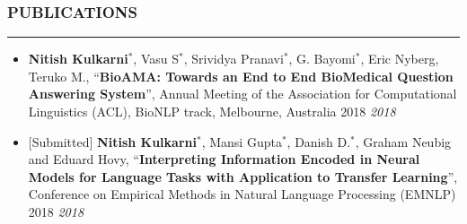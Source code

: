 \documentclass[10pt,a4paper,English]{article}
\newcommand\roottitle[1]{\vspace{-4mm}\subsubsection*{\uppercase{#1}}\vspace{-0.3em}\nopagebreak[4]\hrule\vspace{4mm}}
\newcommand\itemyear[1]{\hfill \emph{\color{itemyear} #1}}
\begin{document}
\roottitle{Publications}
\begin{itemize}[align=left, leftmargin=1em, itemindent=0mm, labelsep=0pt, labelwidth=1em]
    \vspace{-1.5mm}
    \item \textbf{\textbf{Nitish Kulkarni}$^*$}, Vasu S$^*$, Srividya Pranavi$^*$, G. Bayomi$^*$, Eric Nyberg, Teruko M., ``\textbf{BioAMA: Towards an End to End BioMedical Question Answering System}'', Annual Meeting of the Association for Computational Linguistics  (ACL), BioNLP track, Melbourne, Australia 2018 \itemyear{2018}
    \item $\lbrack$Submitted$\rbrack$ \textbf{\textbf{Nitish Kulkarni}$^*$}, Mansi Gupta$^*$, Danish D.$^*$, Graham Neubig and Eduard Hovy, ``\textbf{Interpreting Information Encoded in Neural Models for Language Tasks with Application to Transfer Learning}'', Conference on Empirical Methods in Natural Language Processing (EMNLP) 2018 \itemyear{2018}
\end{itemize}
\end{document}
